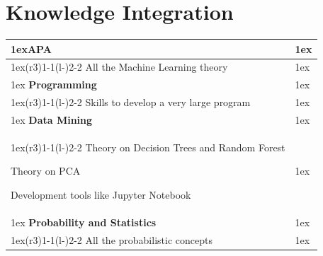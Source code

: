 \documentclass{article}
\begin{document}
\section{Knowledge Integration}
\begin{table}
\begin{tabularx}{\linewidth}{>{\parskip1ex}X@{\kern4\tabcolsep}>{\parskip1ex}X}
\toprule
\hfil\bfseries APA
\\\cmidrule(r{3\tabcolsep}){1-1}\cmidrule(l{-\tabcolsep}){2-2}
All the Machine Learning theory\par
\\\bottomrule
\hfil\bfseries Programming
\\\cmidrule(r{3\tabcolsep}){1-1}\cmidrule(l{-\tabcolsep}){2-2}
Skills to develop a very large program\par
\\\bottomrule
\hfil\bfseries Data Mining
\\\cmidrule(r{3\tabcolsep}){1-1}\cmidrule(l{-\tabcolsep}){2-2}
Theory on Decision Trees and Random Forest\par
Theory on PCA\par
Development tools like Jupyter Notebook
\\\bottomrule
\hfil\bfseries Probability and Statistics
\\\cmidrule(r{3\tabcolsep}){1-1}\cmidrule(l{-\tabcolsep}){2-2}
All the probabilistic concepts\par
\\\bottomrule
\end{tabularx}
\end{table}
\end{document}
